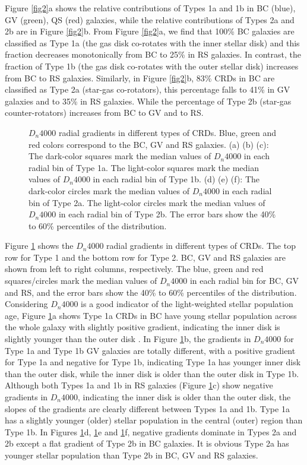 \documentclass{aastex631}
\begin{document}
Figure \ref{fig2}a shows the relative contributions of Types 1a and 1b in BC (blue), GV (green), QS (red) galaxies, while the relative contributions of Types 2a and 2b are in Figure \ref{fig2}b. From Figure \ref{fig2}a, we find that 100\% BC galaxies are classified as Type 1a (the gas disk co-rotates with the inner stellar disk) and this fraction decreases monotonically from BC to 25\% in RS galaxies. In contrast, the fraction of Type 1b (the gas disk co-rotates with the outer stellar disk) increases from BC to RS galaxies. Similarly, in Figure \ref{fig2}b, 83\% CRDs in BC are classified as Type 2a (star-gas co-rotators), this percentage falls to 41\% in GV galaxies and to 35\% in RS galaxies. While the percentage of Type 2b (star-gas counter-rotators) increases from BC to GV and to RS. 

\begin{figure}[ht!]
    \caption{$D_{n}4000$ radial gradients in different types of CRDs. Blue, green and red colors correspond to the BC, GV and RS galaxies. (a) (b) (c): The dark-color squares mark the median values of $D_{n}4000$ in each radial bin of Type 1a. The light-color squares mark the median values of $D_{n}4000$ in each radial bin of Type 1b. (d) (e) (f): The dark-color circles mark the median values of $D_{n}4000$ in each radial bin of Type 2a. The light-color circles mark the median values of $D_{n}4000$ in each radial bin of Type 2b. The error bars show the 40\% to 60\% percentiles of the distribution. \label{fig3}}
    \end{figure}

Figure \ref{fig3} shows the $D_{n}4000$ radial gradients in different types of CRDs. The top row for Type 1 and the bottom row for Type 2. BC, GV and RS galaxies are shown from left to right columns, respectively. The blue, green and red squares/circles mark the median values of $D_{n}4000$ in each radial bin for BC, GV and RS, and the error bars show the 40\% to 60\% percentiles of the distribution. Considering $D_{n}4000$ is a good indicator of the light-weighted stellar population age, Figure \ref{fig3}a shows Type 1a CRDs in BC have young stellar population across the whole galaxy with slightly positive gradient, indicating the inner disk is slightly younger than the outer disk \citep{2013A&A...549A...3C, 2017MNRAS.464.4789M}.  In Figure \ref{fig3}b, the gradients in $D_{n}4000$ for Type 1a and Type 1b GV galaxies are totally different, with a positive gradient for Type 1a and negative for Type 1b, indicating Type 1a has younger inner disk than the outer disk, while the inner disk is older than the outer disk in Type 1b. Although both Types 1a and 1b in RS galaxies (Figure \ref{fig3}c) show negative gradients in $D_{n}4000$, indicating the inner disk is older than the outer disk, the slopes of the gradients are clearly different between Types 1a and 1b. Type 1a has a slightly younger (older) stellar population in the central (outer) region than Type 1b. In Figures \ref{fig3}d, \ref{fig3}e and \ref{fig3}f, negative gradients dominate in Types 2a and 2b \citep{2015A&A...581A..65C, 2018A&A...616A..22P} except a flat gradient of Type 2b in BC galaxies. It is obvious Type 2a has younger stellar population than Type 2b in BC, GV and RS galaxies.
\end{document}
